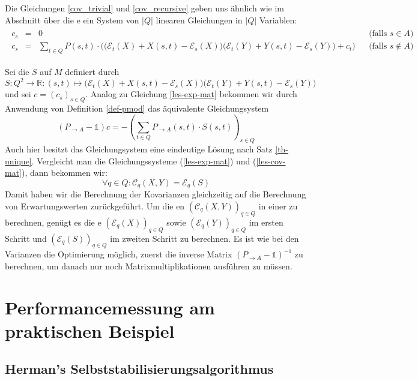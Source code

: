 \documentclass[a4paper]{article}
\theoremstyle{nonumberplain}
\begin{document}
{Die Gleichungen \ref{cov_trivial} und \ref{cov_recursive} geben uns ähnlich wie im Abschnitt über die \expect{}e ein System von $|Q|$ linearen Gleichungen in $|Q|$ Variablen:
\begin{align}
\begin{aligned}
c_s & = & 0 && \text{(falls $s \in A$)}\\
c_s & = & \sum_{t \in Q}P(s,t) \cdot \Big( \big(\mathcal{E}_{t}(X) + X(s,t) - \mathcal{E}_{s}(X)\big)\big(\mathcal{E}_{t}(Y) + Y(s,t) - \mathcal{E}_{s}(Y)\big) + c_t\Big) && \text{(falls $s \notin A$)}
\end{aligned}
\end{align}

Sei die \reward{} $S$ auf $M$ definiert durch $S: Q^2 \to \mathbb{R} : (s,t) \mapsto \big(\mathcal{E}_{t}(X) + X(s,t) - \mathcal{E}_{s}(X)\big)\big(\mathcal{E}_{t}(Y) + Y(s,t) - \mathcal{E}_{s}(Y)\big)$ und sei $c = (c_s)_{s\in Q}$. Analog zu Gleichung \ref{les-exp-mat} bekommen wir durch Anwendung von Definition \ref{def-pmod} das äquivalente Gleichungsystem
\begin{equation}
(P_{\rightarrow A} - \mathbb{1}) c = - \left(\sum_{t \in Q}{ P_{\rightarrow A}(s,t) \cdot S(s,t) }\right)_{s \in Q}\label{les-cov-mat}
\end{equation}
Auch hier besitzt das Gleichungsystem eine eindeutige Lösung nach Satz \ref{th-unique}. Vergleicht man die Gleichungssysteme (\ref{les-exp-mat}) und (\ref{les-cov-mat}), dann bekommen wir:
\begin{equation}
\forall q \in Q : \mathcal{C}_q(X,Y) = \mathcal{E}_q(S)
\end{equation}
Damit haben wir die Berechnung der Kovarianzen gleichzeitig auf die Berechnung von Erwartungswerten zurückgeführt. Um die \cov{}en $(\mathcal{C}_q(X,Y))_{q\in Q}$ in einer \mc{} zu berechnen, genügt es die \expect{}e $(\mathcal{E}_q(X))_{q\in Q}$ sowie $(\mathcal{E}_q(Y))_{q\in Q}$ im ersten Schritt und $(\mathcal{E}_q(S))_{q\in Q}$ im zweiten Schritt zu berechnen. Es ist wie bei den Varianzen die Optimierung möglich, zuerst die inverse Matrix $(P_{\rightarrow A} - \mathbb{1})^{-1}$ zu berechnen, um danach nur noch Matrixmultiplikationen ausführen zu müssen.


\section{Performancemessung am praktischen Beispiel}

\subsection{Herman's Selbststabilisierungsalgorithmus}

}
\end{document}
